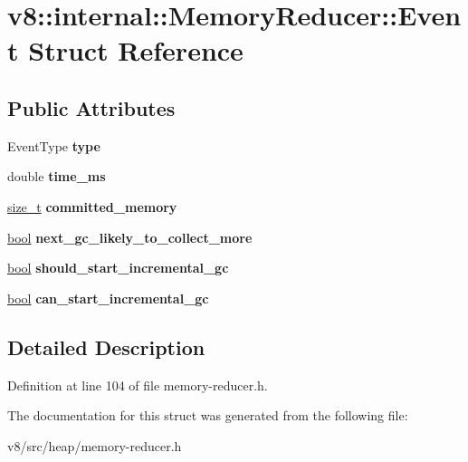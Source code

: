 \hypertarget{structv8_1_1internal_1_1MemoryReducer_1_1Event}{}\section{v8\+:\+:internal\+:\+:Memory\+Reducer\+:\+:Event Struct Reference}
\label{structv8_1_1internal_1_1MemoryReducer_1_1Event}
\subsection*{Public Attributes}
\begin{DoxyCompactItemize}
\item 
\mbox{\label{structv8_1_1internal_1_1MemoryReducer_1_1Event_a10deb19d76cb4bcb0ecadaf05e9cb878}} 
Event\+Type {\bfseries type}
\item 
\mbox{\label{structv8_1_1internal_1_1MemoryReducer_1_1Event_a8bbd85b79f523bc8e8a79edfe2bdd74e}} 
double {\bfseries time\+\_\+ms}
\item 
\mbox{\label{structv8_1_1internal_1_1MemoryReducer_1_1Event_a1ebcab4dfaf90280650991f682f117f0}} 
\mbox{\hyperlink{classsize__t}{size\+\_\+t}} {\bfseries committed\+\_\+memory}
\item 
\mbox{\label{structv8_1_1internal_1_1MemoryReducer_1_1Event_a56faabbcce0dd300632aced5b63eed43}} 
\mbox{\hyperlink{classbool}{bool}} {\bfseries next\+\_\+gc\+\_\+likely\+\_\+to\+\_\+collect\+\_\+more}
\item 
\mbox{\label{structv8_1_1internal_1_1MemoryReducer_1_1Event_a3e7d82cb205ad52638330a9eda53f185}} 
\mbox{\hyperlink{classbool}{bool}} {\bfseries should\+\_\+start\+\_\+incremental\+\_\+gc}
\item 
\mbox{\label{structv8_1_1internal_1_1MemoryReducer_1_1Event_ae5968ba719482ceea0211f4df94157af}} 
\mbox{\hyperlink{classbool}{bool}} {\bfseries can\+\_\+start\+\_\+incremental\+\_\+gc}
\end{DoxyCompactItemize}


\subsection{Detailed Description}


Definition at line 104 of file memory-\/reducer.\+h.



The documentation for this struct was generated from the following file\+:\begin{DoxyCompactItemize}
\item 
v8/src/heap/memory-\/reducer.\+h\end{DoxyCompactItemize}

